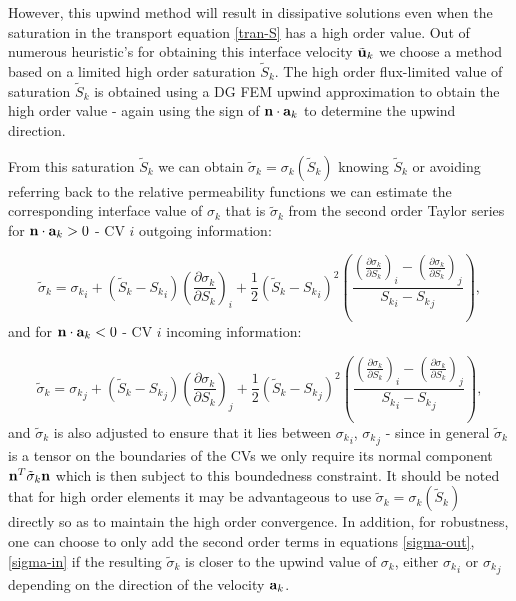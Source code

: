 However, this upwind method will result in dissipative solutions even when the saturation in the transport equation \ref{tran-S}
has a high order value.
Out of numerous heuristic's for obtaining this interface velocity ${\tilde{\bf u}}_k$ we choose
a method based on a limited high order saturation $\tilde S_k$.
The high order flux-limited value of saturation $\tilde S_k$ is obtained using a DG FEM upwind approximation to
obtain the high order value - again using the
sign of ${\bf n}\cdot {\bf a}_k$ to determine the upwind direction.

From this saturation $\tilde S_k$ we can obtain
$\tilde\sigma_k = \sigma_k (\tilde S_k)$ knowing $\tilde S_k$ or avoiding referring back to the relative
permeability functions
we can estimate the corresponding interface value of $\sigma_k$ that is
$\tilde\sigma_k$ from the second order Taylor series for ${\bf n}\cdot {\bf a}_k>0$ - CV $i$ outgoing information:

\begin{equation}
\tilde\sigma_k =   {\sigma_k}_i + (\tilde S_k - {S_k}_i) \left(\frac{\partial\sigma_k}{\partial S_k}\right)_i
+\frac{1}{2} (\tilde S_k - {S_k}_i)^2
\left(  \frac{  \left(\frac{\partial\sigma_k}{\partial S_k}\right)_i - \left(\frac{\partial\sigma_k}{\partial S_k}\right)_j  }
{{S_k}_i - {S_k}_j}  \right) ,
\label{sigma-out}
\end{equation}
and for ${\bf n}\cdot {\bf a}_k<0$ - CV $i$ incoming information:

\begin{equation}
\tilde\sigma_k =  {\sigma_k}_j + (\tilde S_k - {S_k}_j) \left(\frac{\partial\sigma_k}{\partial S_k}\right)_j
+\frac{1}{2} (\tilde S_k - {S_k}_j)^2
\left(  \frac{  \left(\frac{\partial\sigma_k}{\partial S_k}\right)_i - \left(\frac{\partial\sigma_k}{\partial S_k}\right)_j  }
{{S_k}_i - {S_k}_j} \right),
\label{sigma-in}
\end{equation}
and $\tilde\sigma_k$ is also adjusted to ensure that it lies between ${\sigma_k}_i$, ${\sigma_k}_j$ - since
in general $\tilde\sigma_k$ is a tensor on the boundaries of the CVs we only require its
normal component ${\bf n}^T\tilde\sigma_k {\bf n}$ which is then subject to this boundedness constraint.
It should be noted that for high order elements it may be advantageous to use $\tilde\sigma_k = \sigma_k (\tilde S_k)$
directly so as to maintain the high order convergence. In addition, for robustness, one can
choose to only add the second order terms in equations  \ref{sigma-out}, \ref{sigma-in} if the resulting
$\tilde\sigma_k $ is closer to the upwind value of $\sigma_k$, either ${\sigma_k}_i$ or ${\sigma_k}_j$
depending on the direction of the velocity ${\bf a}_k$.

